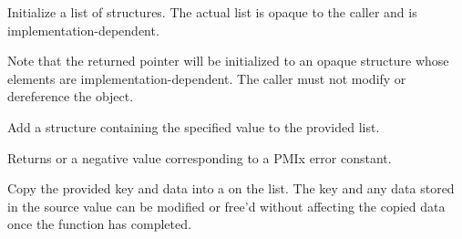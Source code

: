 
\summary

Initialize a list of  structures. The actual list is opaque to the caller and is implementation-dependent.

\format


\descr

Note that the returned pointer will be initialized to an opaque structure whose elements are implementation-dependent. The caller must not modify or dereference the object.


\summary

Add a  structure containing the specified value to the provided list.

\format


\begin{arglist}
\end{arglist}

Returns  or a negative value corresponding to a PMIx error constant.

\descr

Copy the provided key and data into a  on the list. The key and any data stored in the source value can be modified or free'd without affecting the copied data once the function has completed.

